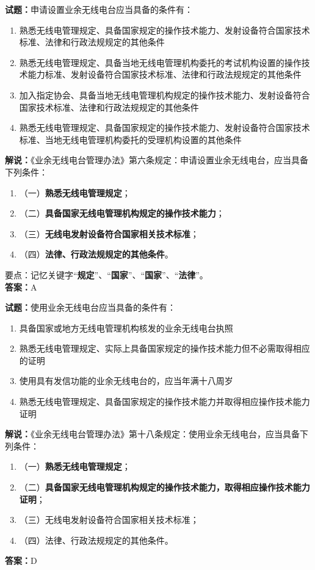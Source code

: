 \documentclass{ctexbook}
\begin{document}
\bigskip


\noindent\textbf{试题：}申请设置业余无线电台应当具备的条件有：
\begin{enumerate}[leftmargin=3em]
\item 熟悉无线电管理规定、具备国家规定的操作技术能力、发射设备符合国家技术标准、法律和行政法规规定的其他条件
\item 熟悉无线电管理规定、具备当地无线电管理机构委托的考试机构设置的操作技术能力标准、发射设备符合国家技术标准、法律和行政法规规定的其他条件
\item 加入指定协会、具备当地无线电管理机构规定的操作技术能力、发射设备符合国家技术标准、法律和行政法规规定的其他条件
\item 熟悉无线电管理规定、具备国家规定的操作技术能力、发射设备符合国家技术标准、当地无线电管理机构委托的受理机构设置的其他条件
\end{enumerate}
\noindent\textbf{解说：}《业余无线电台管理办法》第六条规定：申请设置业余无线电台，应当具备下列条件：
\begin{enumerate}[label=, leftmargin=0.8em]
\item （一）\textbf{熟悉无线电管理规定}；
\item （二）\textbf{具备国家无线电管理机构规定的操作技术能力}；
\item （三）\textbf{无线电发射设备符合国家相关技术标准}；
\item （四）\textbf{法律、行政法规规定的其他条件}。
\end{enumerate}
要点：记忆关键字“\textbf{规定}”、“\textbf{国家}”、“\textbf{国家}”、“\textbf{法律}”。\\\noindent\textbf{答案：}A


\bigskip


\noindent\textbf{试题：}使用业余无线电台应当具备的条件有：
\begin{enumerate}[leftmargin=3em]
\item 具备国家或地方无线电管理机构核发的业余无线电台执照
\item 熟悉无线电管理规定、实际上具备国家规定的操作技术能力但不必需取得相应的证明
\item 使用具有发信功能的业余无线电台的，应当年满十八周岁
\item 熟悉无线电管理规定、具备国家规定的操作技术能力并取得相应操作技术能力证明
\end{enumerate}
\noindent\textbf{解说：}《业余无线电台管理办法》第十八条规定：使用业余无线电台，应当具备下列条件：
\begin{enumerate}[label=, leftmargin=0.8em]
\item （一）\textbf{熟悉无线电管理规定}；
\item （二）\textbf{具备国家无线电管理机构规定的操作技术能力，取得相应操作技术能力证明}；
\item （三）无线电发射设备符合国家相关技术标准；
\item （四）法律、行政法规规定的其他条件。
\end{enumerate}
\noindent\textbf{答案：}D
\end{document}
